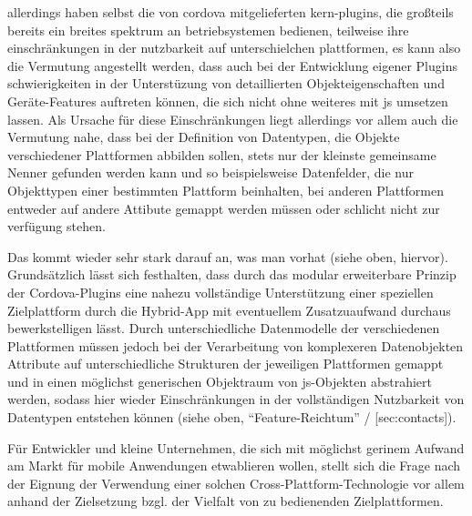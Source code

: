 allerdings haben selbst die von cordova mitgelieferten kern-plugins, die großteils bereits ein breites spektrum an betriebsystemen bedienen, teilweise ihre einschränkungen in der nutzbarkeit auf unterschielchen plattformen, es kann also die Vermutung angestellt werden, dass auch bei der Entwicklung eigener Plugins schwierigkeiten in der Unterstüzung von detaillierten Objekteigenschaften und Geräte-Features auftreten können, die sich nicht ohne weiteres mit \gls{js} umsetzen lassen. 
Als Ursache für diese Einschränkungen liegt allerdings vor allem auch die Vermutung nahe, dass bei der Definition von Datentypen, die Objekte verschiedener Plattformen abbilden sollen, stets nur der kleinste gemeinsame Nenner gefunden werden kann und so beispielsweise Datenfelder, die nur Objekttypen einer bestimmten Plattform beinhalten, bei anderen Plattformen entweder auf andere Attibute gemappt werden müssen oder schlicht nicht zur verfügung stehen. 


Das kommt wieder sehr stark darauf an, was man vorhat (siehe oben, hiervor).
Grundsätzlich lässt sich festhalten, dass durch das modular erweiterbare Prinzip der Cordova-Plugins eine nahezu vollständige Unterstützung einer speziellen Zielplattform durch die Hybrid-App mit eventuellem Zusatzuaufwand durchaus bewerkstelligen lässt. 
Durch unterschiedliche Datenmodelle der verschiedenen Plattformen müssen jedoch bei der Verarbeitung von komplexeren Datenobjekten Attribute auf unterschiedliche Strukturen der jeweiligen Plattformen gemappt und in einen möglichst generischen Objektraum von \gls{js}-Objekten abstrahiert werden, sodass hier wieder Einschränkungen in der vollständigen Nutzbarkeit von Datentypen entstehen können (siehe oben, “Feature-Reichtum” / [sec:contacts]).


Für Entwickler und kleine Unternehmen, die sich mit möglichst gerinem Aufwand am Markt für mobile Anwendungen etwablieren wollen, stellt sich die Frage nach der Eignung der Verwendung einer solchen Cross-Plattform-Technologie vor allem anhand der Zielsetzung bzgl. der Vielfalt von zu bedienenden Zielplattformen.


